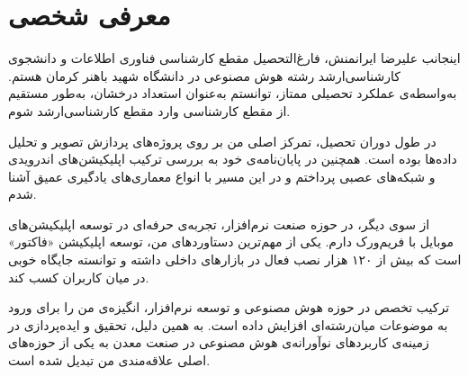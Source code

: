 \chapter{معرفی شخصی}

اینجانب علیرضا ایرانمنش، فارغ‌التحصیل مقطع کارشناسی فناوری اطلاعات و دانشجوی کارشناسی‌ارشد رشته هوش مصنوعی در دانشگاه شهید باهنر کرمان هستم. 
به‌واسطه‌ی عملکرد تحصیلی ممتاز، توانستم به‌عنوان استعداد درخشان، به‌طور مستقیم از مقطع کارشناسی وارد مقطع کارشناسی‌ارشد شوم. 

در طول دوران تحصیل، تمرکز اصلی من بر روی پروژه‌های پردازش تصویر و تحلیل داده‌ها بوده است. 
همچنین در پایان‌نامه‌ی خود به بررسی ترکیب اپلیکیشن‌های اندرویدی و شبکه‌های عصبی پرداختم و در این مسیر با انواع معماری‌های یادگیری عمیق آشنا شدم. 

از سوی دیگر، در حوزه صنعت نرم‌افزار، تجربه‌ی حرفه‌ای در توسعه اپلیکیشن‌های موبایل با فریم‌ورک  دارم. 
یکی از مهم‌ترین دستاوردهای من، توسعه اپلیکیشن «فاکتور» است که بیش از ۱۲۰ هزار نصب فعال در بازارهای داخلی داشته و توانسته جایگاه خوبی در میان کاربران کسب کند. 

ترکیب تخصص در حوزه هوش مصنوعی و توسعه نرم‌افزار، انگیزه‌ی من را برای ورود به موضوعات میان‌رشته‌ای افزایش داده است. 
به همین دلیل، تحقیق و ایده‌پردازی در زمینه‌ی کاربردهای نوآورانه‌ی هوش مصنوعی در صنعت معدن به یکی از حوزه‌های اصلی علاقه‌مندی من تبدیل شده است.
